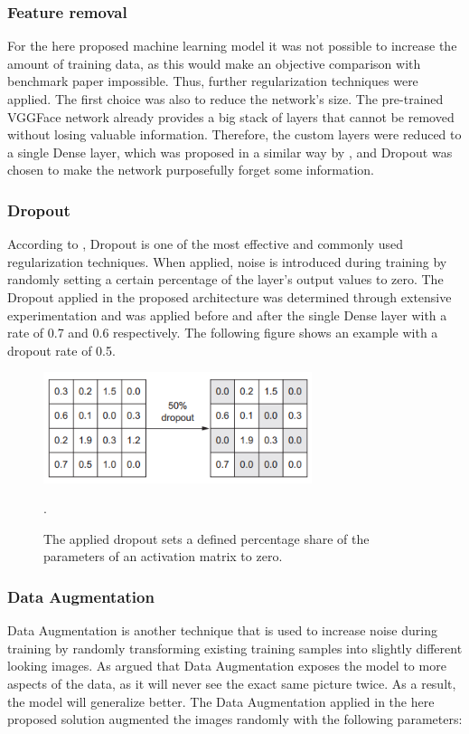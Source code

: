 \subsubsection{Feature removal}
For the here proposed machine learning model it was not possible to increase the amount of training data, as this would make an objective comparison with benchmark paper impossible. Thus, further regularization techniques were applied. The first choice was also to reduce the network's size. The pre-trained VGGFace network already provides a big stack of layers that cannot be removed without losing valuable information. Therefore, the custom layers were reduced to a single Dense layer, which was proposed in a similar way by \citet{Pittaras:2017:FineTuningStrategiesComparison}, and Dropout was chosen to make the network purposefully forget some information.

\subsubsection{Dropout}
According to \citet{Chollet:2017:DeepLearningPython}, Dropout is one of the most effective and commonly used regularization techniques. When applied, noise is introduced during training by randomly setting a certain percentage of the layer's output values to zero. The Dropout applied in the proposed architecture was determined through extensive experimentation and was applied before and after the single Dense layer with a rate of 0.7 and 0.6 respectively. The following figure shows an example with a dropout rate of 0.5.

\begin{figure}[H]
  \begin{center}
  \includegraphics[angle=0, width=0.7\textwidth]{Figures/dropout.PNG}
  \caption{The applied dropout sets a defined percentage share of the parameters of an activation matrix to zero.\citep{Chollet:2017:DeepLearningPython}}.
  \label{fig:Dropout}
  \end{center}
\end{figure}

\subsubsection{Data Augmentation}
Data Augmentation is another technique that is used to increase noise during training by randomly transforming existing training samples into slightly different looking images. As \citet{Chollet:2017:DeepLearningPython} argued that Data Augmentation exposes the model to more aspects of the data, as it will never see the exact same picture twice. As a result, the model will generalize better.
The Data Augmentation applied in the here proposed solution augmented the images randomly with the following parameters:

